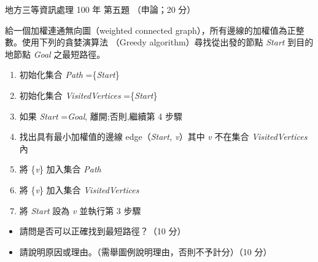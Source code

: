 \begin{pastexam}[label={px:df3-100-ds-05}]{地方三等資訊處理 100 年 第五題}
（申論；20 分）

給一個加權連通無向圖（weighted connected graph），所有邊線的加權值為正整數。使用下列的貪婪演算法
（Greedy algorithm）尋找從出發的節點 \textit{Start} 到目的地節點 \textit{Goal} 之最短路徑。
\begin{enumerate}[nosep]
\item 初始化集合 \textit{Path} =\{\textit{Start}\}
\item 初始化集合 \textit{VisitedVertices} =\{\textit{Start}\}
\item 如果 \textit{Start} =\textit{Goal}, 離開;否則,繼續第 4 步驟
\item 找出具有最小加權值的邊線 edge（\textit{Start, v}）其中 \textit{v} 不在集合 \textit{VisitedVertices} 內
\item 將 \{\textit{v}\} 加入集合 \textit{Path}
\item 將 \{\textit{v}\} 加入集合 \textit{VisitedVertices}
\item 將 \textit{Start} 設為 \textit{v} 並執行第 3 步驟
\end{enumerate}
\begin{itemize}[leftmargin=2.2em, nosep]
\item[㈠] 請問是否可以正確找到最短路徑？（10 分）
\item[㈡] 請說明原因或理由。（需舉圖例說明理由，否則不予計分）（10 分）
\end{itemize}
\end{pastexam}

